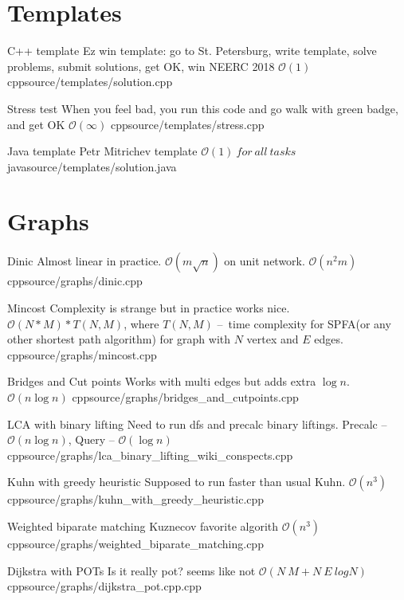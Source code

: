 \documentclass[landscape, 10pt, a4paper, oneside, twocolumn]{extarticle}
\begin{document}
\maketitlepage



\section{Templates}

\Algorithm
{C++ template}
{Ez win template: go to St. Petersburg, write template, solve problems, submit solutions, get OK, win NEERC 2018}
{$\mathcal{O}(1)$}
{cpp}{source/templates/solution.cpp}

\Algorithm
{Stress test}
{When you feel bad, you run this code and go walk with green badge, and get OK}
{$\mathcal{O}(\infty)$}
{cpp}{source/templates/stress.cpp}

\Algorithm
{Java template}
{Petr Mitrichev template}
{$\mathcal{O}(1)\ for\ all\ tasks$}
{java}{source/templates/solution.java}

\section{Graphs}

\Algorithm
{Dinic}
{Almost linear in practice. $\mathcal{O}(m \sqrt n)$ on unit network.}
{$\mathcal{O}(n^{2}m)$}
{cpp}{source/graphs/dinic.cpp}

\Algorithm
{Mincost}
{Complexity is strange but in practice works nice.}
{$\mathcal{O}(N * M) * T(N, M)$, where $T(N, M)$ – time complexity for SPFA(or any other shortest path algorithm) for graph with $N$ vertex and $E$ edges.}
{cpp}{source/graphs/mincost.cpp}

\Algorithm
{Bridges and Cut points}
{Works with multi edges but adds extra $ \log n$.}
{$\mathcal{O}(n \log n)$}
{cpp}{source/graphs/bridges_and_cutpoints.cpp}

\Algorithm
{LCA with binary lifting}
{Need to run dfs and precalc binary liftings.}
{Precalc – $\mathcal{O}(n \log n)$, Query – $\mathcal{O}(\log n)$}
{cpp}{source/graphs/lca_binary_lifting_wiki_conspects.cpp}

\Algorithm
{Kuhn with greedy heuristic}
{Supposed to run faster than usual Kuhn.}
{$\mathcal{O}(n^{3})$}
{cpp}{source/graphs/kuhn_with_greedy_heuristic.cpp}

\Algorithm
{Weighted biparate matching}
{Kuznecov favorite algorith}
{$\mathcal{O}(n^{3})$}
{cpp}{source/graphs/weighted_biparate_matching.cpp}

\Algorithm
{Dijkstra with POTs}
{Is it really pot? seems like not}
{$\mathcal{O}(N\ M + N\ E\ logN)$}
{cpp}{source/graphs/dijkstra_pot.cpp.cpp}
\end{document}
